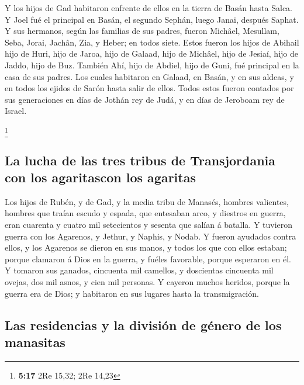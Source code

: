  Y los hijos de Gad habitaron enfrente de ellos en la
tierra de Basán hasta Salca.  Y Joel fué el principal en
Basán, el segundo Sephán, luego Janai, después Saphat.  Y
sus hermanos, según las familias de sus padres, fueron Michâel,
Mesullam, Seba, Jorai, Jachân, Zia, y Heber; en todos siete.
 Estos fueron los hijos de Abihail hijo de Huri, hijo de
Jaroa, hijo de Galaad, hijo de Michâel, hijo de Jesiaí, hijo de Jaddo,
hijo de Buz.  También Ahí, hijo de Abdiel, hijo de Guni,
fué principal en la casa de sus padres.  Los cuales
habitaron en Galaad, en Basán, y en sus aldeas, y en todos los ejidos de
Sarón hasta salir de ellos.  Todos estos fueron contados
por sus generaciones en días de Jothán rey de Judá, y en días de
Jeroboam rey de Israel.

\footnote{\textbf{5:17} 2Re 15,32; 2Re 14,23}

\hypertarget{la-lucha-de-las-tres-tribus-de-transjordania-con-los-agaritascon-los-agaritas}{%
\subsection{La lucha de las tres tribus de Transjordania con los
agaritascon los
agaritas}\label{la-lucha-de-las-tres-tribus-de-transjordania-con-los-agaritascon-los-agaritas}}

 Los hijos de Rubén, y de Gad, y la media tribu de Manasés,
hombres valientes, hombres que traían escudo y espada, que entesaban
arco, y diestros en guerra, eran cuarenta y cuatro mil setecientos y
sesenta que salían á batalla.  Y tuvieron guerra con los
Agarenos, y Jethur, y Naphis, y Nodab.  Y fueron ayudados
contra ellos, y los Agarenos se dieron en sus manos, y todos los que con
ellos estaban; porque clamaron á Dios en la guerra, y fuéles favorable,
porque esperaron en él.  Y tomaron sus ganados, cincuenta
mil camellos, y doscientas cincuenta mil ovejas, dos mil asnos, y cien
mil personas.  Y cayeron muchos heridos, porque la guerra
era de Dios; y habitaron en sus lugares hasta la transmigración.

\hypertarget{las-residencias-y-la-divisiuxf3n-de-guxe9nero-de-los-manasitas}{%
\subsection{Las residencias y la división de género de los
manasitas}\label{las-residencias-y-la-divisiuxf3n-de-guxe9nero-de-los-manasitas}}

